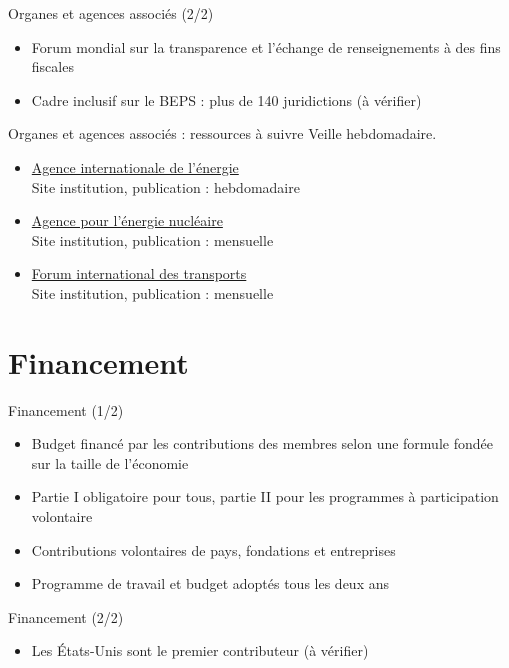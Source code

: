 \documentclass[aspectratio=169,11pt]{beamer}
\begin{document}
\begin{frame}{Organes et agences associés (2/2)}
\begin{itemize}
\item Forum mondial sur la transparence et l'échange de renseignements à des fins fiscales
\item Cadre inclusif sur le BEPS : plus de 140 juridictions (à vérifier)
\end{itemize}
\end{frame}

\begin{frame}{Organes et agences associés : ressources à suivre}
\small
Veille hebdomadaire.
\begin{itemize}
\item \href{https://www.iea.org}{Agence internationale de l'énergie}\\{\footnotesize Site institution, publication : hebdomadaire}
\item \href{https://www.oecd-nea.org}{Agence pour l'énergie nucléaire}\\{\footnotesize Site institution, publication : mensuelle}
\item \href{https://www.itf-oecd.org}{Forum international des transports}\\{\footnotesize Site institution, publication : mensuelle}
\end{itemize}
\end{frame}

\section{Financement}
\begin{frame}{Financement (1/2)}
\begin{itemize}
\item Budget financé par les contributions des membres selon une formule fondée sur la taille de l'économie
\item Partie I obligatoire pour tous, partie II pour les programmes à participation volontaire
\item Contributions volontaires de pays, fondations et entreprises
\item Programme de travail et budget adoptés tous les deux ans
\end{itemize}
\end{frame}

\begin{frame}{Financement (2/2)}
\begin{itemize}
\item Les États-Unis sont le premier contributeur (à vérifier)
\end{itemize}
\end{frame}
\end{document}
